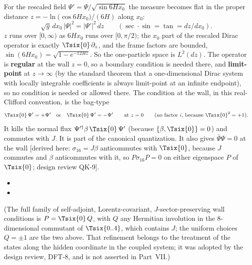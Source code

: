 For the rescaled field $\Psi'=\Psi/\sqrt{\sin 6Hx_0}$ the measure becomes flat in the proper distance
$z=-\ln\bigl(\cos 6Hx_0\bigr)/(6H)$ along $x_0$:
\[
  \sqrt g\,dx_0\,|\Psi|^2=|\Psi'|^2\,dz\qquad(\sec\cdot\sin=\tan=dz/dx_0).
\]
$z$ runs over $[0,\infty)$ as $6Hx_0$ runs over $[0,\pi/2)$; the $x_0$ part of the rescaled Dirac
operator is exactly $\Tsix{0}\,\partial_z$, and the frame factors are bounded,
$\sin(6Hx_0)=\sqrt{1-e^{-12Hz}}$. So the one-particle space is $L^2(dz)$. The operator is
\textbf{regular} at the wall $z=0$, so a boundary condition is needed there, and
\textbf{limit-point} at $z\to\infty$ (by the standard theorem that a one-dimensional Dirac system with
locally integrable coefficients is always limit-point at an infinite endpoint), so no condition is
needed or allowed there. The condition at the wall, in this real-Clifford convention, is the
bag-type
\[
  \Tsix{0}\,\Psi'=+\Psi'\quad\text{or}\quad\Tsix{0}\,\Psi'=-\Psi'\qquad\text{at } z=0
  \qquad(\text{no factor } i\text{, because } \Tsix{0}^2=+1).
\]
It kills the normal flux $\Psi'^{\dagger}\beta\,\Tsix{0}\,\Psi'$ (because $\{\beta,\Tsix{0}\}=0$) and
commutes with $J$. It is part of the canonical quantization.  It also gives
$\bar\Psi\Psi=0$ at the wall [derived here: $\sigma_{16}=J\beta$ anticommutes with $\Tsix{0}$, because
$J$ commutes and $\beta$ anticommutes with it, so $P\sigma_{16}P=0$ on either eigenspace $P$ of
$\Tsix{0}$; design review QK-9].
\begin{itemize}
  \item {}
  \item {}
\end{itemize}
(The full family of self-adjoint, Lorentz-covariant, $J$-sector-preserving wall conditions is
$P=\Tsix{0}\,Q$, with $Q$ any Hermitian involution in the 8-dimensional commutant of $\Tsix{0..4}$,
which contains $J$; the uniform choices $Q=\pm1$ are the two above. That refinement belongs to the
treatment of the states along the hidden coordinate in the coupled system; it was adopted by the
design review, DFT-8, and is not asserted in Part~VII.)

